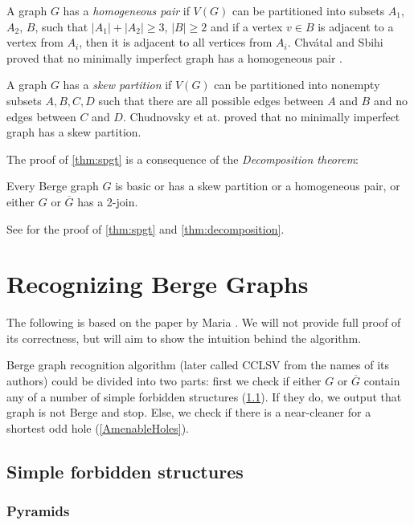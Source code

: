 A graph $G$ has a \emph{homogeneous pair} if $V(G)$ can be partitioned into subsets $A_1$, $A_2$, $B$, such that $|A_1|+|A_2| \geq 3$, $|B| \geq 2$ and if a vertex $v \in B$ is adjacent to a vertex from $A_i$, then it is adjacent to all vertices from $A_i$. Chvátal and Sbihi proved that no minimally imperfect graph has a homogeneous pair \cite{Chvtal1987}.

A graph $G$ has a \emph{skew partition} if $V(G)$ can be partitioned into nonempty subsets $A, B, C, D$ such that there are all possible edges between $A$ and $B$ and no edges between $C$ and $D$. Chudnovsky et at. proved that no minimally imperfect graph has a skew partition.

The proof of \cref{thm:spgt} is a consequence of the \emph{Decomposition theorem}:
\begin{theorem}
	\label{thm:decomposition}
	Every Berge graph $G$ is basic or has a skew partition or a homogeneous pair, or either $G$ or $\overline{G}$ has a 2-join.
\end{theorem}

See \cite{MC06} for the proof of \cref{thm:spgt} and \cref{thm:decomposition}.

\section{Recognizing Berge Graphs}
\label{sec:recognizingBerge}

The following is based on the paper by Maria \citeauthor{MC05}  \cite{MC05}. We will not provide full proof of its correctness, but will aim to show the intuition behind the algorithm.

Berge graph recognition algorithm (later called CCLSV from the names of its authors) could be divided into two parts: first we check if either $G$ or $\overline{G}$ contain any of a number of simple forbidden structures (\cref{SimpleStructures}). If they do, we output that graph is not Berge and stop. Else, we check if there is a near-cleaner for a shortest odd hole (\cref{AmenableHoles}).

\subsection{Simple forbidden structures}
\label{SimpleStructures}

\subsubsection{Pyramids}

